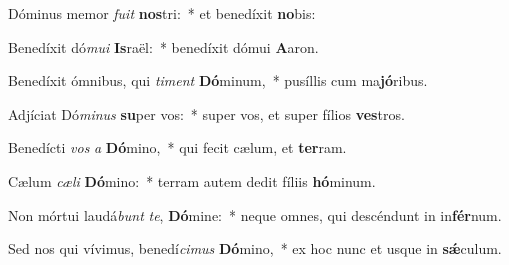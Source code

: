 \item Dóminus memor \textit{fu}\textit{it} \textbf{nos}tri:~* et benedíxit \textbf{no}bis:
\item Benedíxit dó\textit{mu}\textit{i} \textbf{Is}raël:~* benedíxit dómui \textbf{A}aron.
\item Benedíxit ómnibus, qui \textit{ti}\textit{ment} \textbf{Dó}minum,~* pusíllis cum ma\textbf{jó}ribus.
\item Adjíciat Dó\textit{mi}\textit{nus} \textbf{su}per vos:~* super vos, et super fílios \textbf{ves}tros.
\item Benedícti \textit{vos} \textit{a} \textbf{Dó}mino,~* qui fecit cælum, et \textbf{ter}ram.
\item Cælum \textit{cæ}\textit{li} \textbf{Dó}mino:~* terram autem dedit fíliis \textbf{hó}minum.
\item Non mórtui laudá\textit{bunt} \textit{te}, \textbf{Dó}mine:~* neque omnes, qui descéndunt in in\textbf{fér}num.
\item Sed nos qui vívimus, benedí\textit{ci}\textit{mus} \textbf{Dó}mino,~* ex hoc nunc et usque in \textbf{sǽ}culum.
